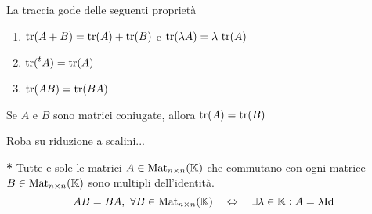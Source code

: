 \begin{propriety}
	La traccia gode delle seguenti proprietà
	\begin{enumerate}[label=(\roman*)]
		\item $ \operatorname{tr} (A + B) = \operatorname{tr}(A) + \operatorname{tr}(B) $ e $ \operatorname{tr}(\lambda A) = \lambda \, \operatorname{tr} (A) $
		\item $ \operatorname{tr}(\prescript{t}{}{A}) = \operatorname{tr} (A) $
		\item $ \operatorname{tr} (AB) = \operatorname{tr} (BA) $
	\end{enumerate}
\end{propriety}

\begin{thm}
	Se $ A $ e $ B $ sono matrici coniugate, allora $ \operatorname{tr} (A) = \operatorname{tr} (B) $
\end{thm}

Roba su riduzione a scalini...

\begin{thm} \textbf{*}
	Tutte e sole le matrici $ A \in \mathrm{Mat}_{n \times n}(\mathbb{K}) $ che commutano con ogni matrice $ B \in  \mathrm{Mat}_{n \times n}(\mathbb{K}) $ sono multipli dell'identità. \[AB = BA, \ \forall B \in \mathrm{Mat}_{n \times n}(\mathbb{K}) \quad \Leftrightarrow \quad \exists \lambda \in \mathbb{K} : A = \lambda \mathrm{Id}\]
\end{thm}
